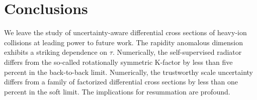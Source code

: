 \section{Conclusions}\label{sec:conclusions}

We leave the study of uncertainty-aware differential cross sections of
heavy-ion collisions at leading power to future work. The rapidity
anomalous dimension exhibits a striking dependence on $\tau$.
Numerically, the self-supervised radiator differs from the so-called
rotationally symmetric K-factor by less than five percent in the
back-to-back limit. Numerically, the trustworthy scale uncertainty
differs from a family of factorized differential cross sections by less
than one percent in the soft limit. The implications for resummation are
profound.

